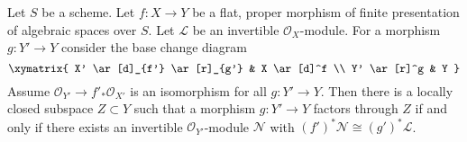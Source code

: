 \begin{lemma}
\label{lemma-diagonal-picard-flat-proper}
Let $S$ be a scheme.
Let $f : X \to Y$ be a flat, proper morphism of finite presentation
of algebraic spaces over $S$.
Let $\mathcal{L}$ be an invertible $\mathcal{O}_X$-module.
For a morphism $g : Y' \to Y$ consider the base change diagram
$$
\xymatrix{
X' \ar[d]_{f'} \ar[r]_{g'} & X \ar[d]^f \\
Y' \ar[r]^g & Y
}
$$
Assume $\mathcal{O}_{Y'} \to f'_*\mathcal{O}_{X'}$ is an
isomorphism for all $g : Y' \to Y$.
Then there is a locally closed subspace $Z \subset Y$ such that
a morphism $g : Y' \to Y$ factors through $Z$ if and only if
there exists an invertible $\mathcal{O}_{Y'}$-module $\mathcal{N}$
with $(f')^*\mathcal{N} \cong (g')^*\mathcal{L}$.
\end{lemma}

